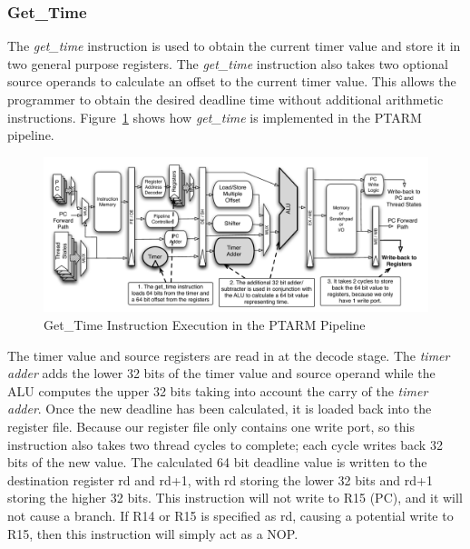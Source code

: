 \subsubsection{Get\_Time}    
The \emph{get\_time} instruction is used to obtain the current timer value and store it in two general purpose registers.
The \emph{get\_time} instruction also takes two optional source operands to calculate an offset to the current timer value. 
This allows the programmer to obtain the desired deadline time without additional arithmetic instructions.
Figure~\ref{fig:get_time_pipeline_implementation} shows how \emph{get\_time} is implemented in the PTARM pipeline. 
\begin{figure}
  \vspace{-20pt}
  \begin{center}
    \includegraphics[scale=.54]{figs/get_time_pipeline_implementation}
  \end{center}
  \vspace{-20pt}
  \caption{Get\_Time Instruction Execution in the PTARM Pipeline}
  \label{fig:get_time_pipeline_implementation}
\end{figure}

The timer value and source registers are read in at the decode stage. 
The \emph{timer adder} adds the lower 32 bits of the timer value and source operand while the ALU computes the upper 32 bits taking into account the carry of the \emph{timer adder}.
Once the new deadline has been calculated, it is loaded back into the register file. 
Because our register file only contains one write port, so this instruction also takes two thread cycles to complete; each cycle writes back 32 bits of the new value. 
The calculated 64 bit deadline value is written to the destination register rd and rd+1, with rd storing the lower 32 bits and rd+1 storing the higher 32 bits. 
This instruction will not write to R15 (PC), and it will not cause a branch. 
If R14 or R15 is specified as rd, causing a potential write to R15, then this instruction will simply act as a NOP.

